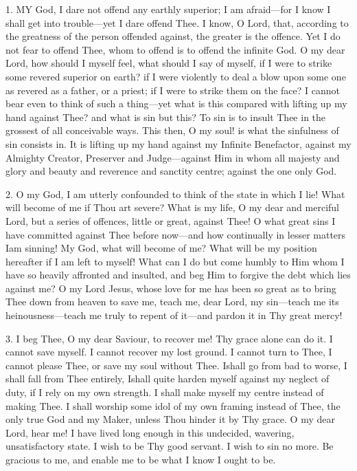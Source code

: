 
1. MY
God, I dare not offend any earthly superior; I am afraid—for I know I
shall get into trouble—yet I dare offend Thee. I know, O Lord, that,
according to the greatness of the person offended against, the greater
is the offence. Yet I do not fear to offend Thee, whom to offend is to
offend the infinite God. O my dear Lord, how should I myself feel, what
should I say of myself, if I were to strike some revered superior on
earth? if I were violently to deal a blow upon some one as revered as a
father, or a priest; if I were to strike them on the face? I cannot bear
even to think of such a thing—yet what is this compared with lifting
up my hand against Thee? and what is sin but this? To sin is to insult
Thee in the grossest of all conceivable ways. This then, O my soul! is
what the sinfulness of sin consists in. It is lifting up my hand against
my Infinite Benefactor, against my Almighty Creator, Preserver and
Judge—against Him in whom all majesty and glory and beauty and
reverence and sanctity centre; against the one only God.

2. O my God, I am utterly
confounded to think of the state in which I lie! What will become of me
if Thou art severe? What is my life, O my dear and merciful Lord, but a
series of offences, little or great, against Thee! O what great sins I
have committed against Thee before now—and how continually in lesser
matters I\emph{}am sinning! My God, what will become of me? What will
be my position hereafter if I am left to myself! What can I do but come
humbly to Him whom I have so heavily affronted and insulted, and beg Him
to forgive the debt which lies against me? O my Lord Jesus, whose love
for me has been so great as to bring Thee down from heaven to save me,
teach me, dear Lord, my sin—teach me its heinousness—teach me truly
to repent of it—and pardon it in Thy great mercy!

3. I beg Thee, O my dear Saviour,
to recover me! Thy grace alone can do it. I cannot save myself. I cannot
recover my lost ground. I cannot turn to Thee, I cannot please Thee, or
save my soul without Thee. I\emph{}shall go from bad to worse, I shall
fall from Thee entirely, I\emph{}shall quite harden myself against my
neglect of duty, if I rely on my own strength. I shall make myself my
centre instead of making Thee. I shall worship some idol of my own
framing instead of Thee, the only true God and my Maker, unless Thou
hinder it by Thy grace. O my dear Lord, hear me! I have lived long
enough in this undecided, wavering, unsatisfactory state. I wish to be
Thy good servant. I wish to sin no more. Be gracious to me, and enable
me to be what I know I ought to be.


